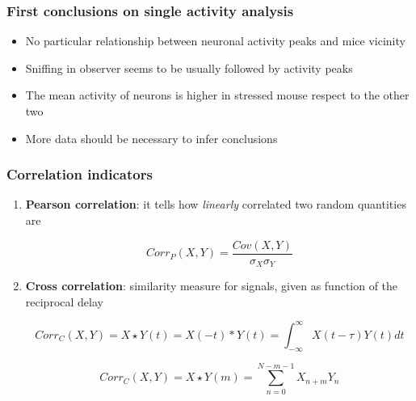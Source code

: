 \documentclass{beamer}
\begin{document}
\begin{frame}
\frametitle{First conclusions on single activity analysis}

\begin{itemize}
	\item No particular relationship between neuronal activity peaks and mice vicinity
	
	\item Sniffing in observer seems to be usually followed by activity peaks
	
	\item The mean activity of neurons is higher in stressed mouse respect to the other two
	
	\item More data should be necessary to infer conclusions
	
	
	
	
\end{itemize}

	

\end{frame}	




\begin{frame}
\frametitle{Correlation indicators}


\begin{enumerate}
	\item \textbf{Pearson correlation}: it tells how \textit{linearly} correlated two random quantities are
	
	$$ Corr_P(X,Y) = \frac{Cov(X,Y)}{\sigma_X \sigma_Y} $$
	
	\item \textbf{Cross correlation}: similarity measure for signals, given as function of the reciprocal delay
	
	$$  Corr_C(X,Y)  = X \star Y (t) = X(-t)*Y(t) = \int_{-\infty}^{\infty}X(t-\tau)Y(t) dt $$
	
	$$  Corr_C(X,Y)  = X \star Y (m) = \sum_{n=0}^{N-m-1} X_{n+m}Y_n  $$
	
	
	
	
	
	
	
	
\end{enumerate}





\end{frame}	
\end{document}
